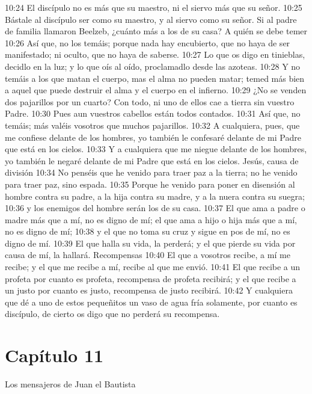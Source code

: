 10:24 El discípulo no es más que su maestro, ni el siervo más que su señor. 
10:25 Bástale al discípulo ser como su maestro, y al siervo como su señor. Si al padre de familia llamaron Beelzeb, ¿cuánto más a los de su casa? 
A quién se debe temer  
10:26 Así que, no los temáis; porque nada hay encubierto, que no haya de ser manifestado; ni oculto, que no haya de saberse. 
10:27 Lo que os digo en tinieblas, decidlo en la luz; y lo que oís al oído, proclamadlo desde las azoteas. 
10:28 Y no temáis a los que matan el cuerpo, mas el alma no pueden matar; temed más bien a aquel que puede destruir el alma y el cuerpo en el infierno. 
10:29 ¿No se venden dos pajarillos por un cuarto? Con todo, ni uno de ellos cae a tierra sin vuestro Padre. 
10:30 Pues aun vuestros cabellos están todos contados. 
10:31 Así que, no temáis; más valéis vosotros que muchos pajarillos. 
10:32 A cualquiera, pues, que me confiese delante de los hombres, yo también le confesaré delante de mi Padre que está en los cielos. 
10:33 Y a cualquiera que me niegue delante de los hombres, yo también le negaré delante de mi Padre que está en los cielos. 
Jesús, causa de división  
10:34 No penséis que he venido para traer paz a la tierra; no he venido para traer paz, sino espada. 
10:35 Porque he venido para poner en disensión al hombre contra su padre, a la hija contra su madre, y a la nuera contra su suegra; 
10:36 y los enemigos del hombre serán los de su casa. 
10:37 El que ama a padre o madre más que a mí, no es digno de mí; el que ama a hijo o hija más que a mí, no es digno de mí; 
10:38 y el que no toma su cruz y sigue en pos de mí, no es digno de mí. 
10:39 El que halla su vida, la perderá; y el que pierde su vida por causa de mí, la hallará. 
Recompensas  
10:40 El que a vosotros recibe, a mí me recibe; y el que me recibe a mí, recibe al que me envió. 
10:41 El que recibe a un profeta por cuanto es profeta, recompensa de profeta recibirá; y el que recibe a un justo por cuanto es justo, recompensa de justo recibirá. 
10:42 Y cualquiera que dé a uno de estos pequeñitos un vaso de agua fría solamente, por cuanto es discípulo, de cierto os digo que no perderá su recompensa. 
  
\section*{Capítulo 11}
Los mensajeros de Juan el Bautista  

